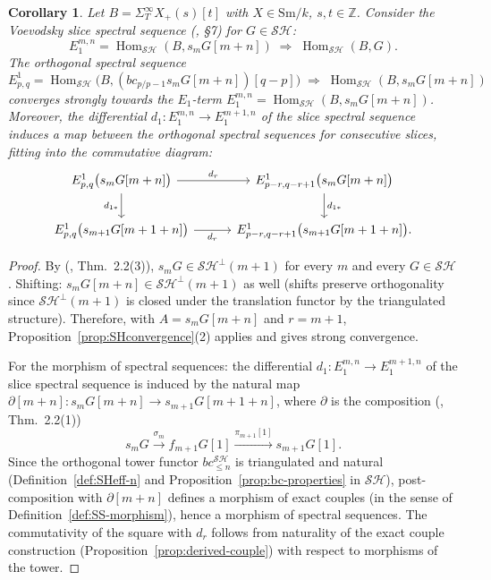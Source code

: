 \documentclass[12pt,a4paper]{article}
\newtheorem{corollary}[theorem]{Corollary}
\theoremstyle{definition}
\newcommand{\Sm}{\mathrm{Sm}}
\newcommand{\SH}{\mathcal{SH}}
\newcommand{\Hom}{\operatorname{Hom}}
\newcommand{\Z}{\mathbb{Z}}
\begin{document}
\begin{corollary}\label{cor:sliceconv}
Let $B=\Sigma_T^\infty X_+(s)[t]$ with $X\in\Sm/k$, $s,t\in\Z$.  Consider the
Voevodsky slice spectral sequence (\cite{Voe02a}, \S7) for $G\in\SH$:
\[
  E_1^{m,n} = \Hom_{\SH}(B,s_mG[m+n])\;\Rightarrow\;\Hom_{\SH}(B,G).
\]
The orthogonal spectral sequence
\[
  E^1_{p,q} = \Hom_{\SH}\!\bigl(B,(bc_{p/p-1}s_mG[m+n])[q-p]\bigr)
  \;\Rightarrow\;\Hom_{\SH}(B,s_mG[m+n])
\]
converges strongly towards the $E_1$-term
$E_1^{m,n}=\Hom_{\SH}(B,s_mG[m+n])$.  Moreover, the differential
$d_1:E_1^{m,n}\to E_1^{m+1,n}$ of the slice spectral sequence induces a map
between the orthogonal spectral sequences for consecutive slices, fitting into
the commutative diagram:
\[
\begin{tikzcd}[column sep=3em, row sep=2em]
  E^1_{p,q}\bigl(s_mG[m+n]\bigr) \ar[r,"d_r"] \ar[d,"d_{1*}"'] &
    E^1_{p-r,q-r+1}\bigl(s_mG[m+n]\bigr) \ar[d,"d_{1*}"] \\
  E^1_{p,q}\bigl(s_{m+1}G[m+1+n]\bigr) \ar[r,"d_r"'] &
    E^1_{p-r,q-r+1}\bigl(s_{m+1}G[m+1+n]\bigr).
\end{tikzcd}
\]
\end{corollary}
\begin{proof}
By (\cite{Voe02a}, Thm.\ 2.2(3)), $s_mG\in\SH^\perp(m+1)$ for every $m$ and every
$G\in\SH$.  Shifting: $s_mG[m+n]\in\SH^\perp(m+1)$ as well (shifts preserve
orthogonality since $\SH^\perp(m+1)$ is closed under the translation functor by
the triangulated structure).  Therefore, with $A=s_mG[m+n]$ and $r=m+1$,
Proposition~\ref{prop:SHconvergence}(2) applies and gives strong convergence.

For the morphism of spectral sequences: the differential
$d_1:E_1^{m,n}\to E_1^{m+1,n}$ of the slice spectral sequence is induced by the
natural map $\partial[m+n]:s_mG[m+n]\to s_{m+1}G[m+1+n]$, where $\partial$ is the
composition (\cite{Voe02a}, Thm.\ 2.2(1))
\[
  s_mG \xrightarrow{\sigma_m} f_{m+1}G[1] \xrightarrow{\pi_{m+1}[1]} s_{m+1}G[1].
\]
Since the orthogonal tower functor $bc_{\leq n}^{\SH}$ is triangulated and natural
(Definition~\ref{def:SHeff-n} and Proposition~\ref{prop:bc-properties} in $\SH$),
post-composition with $\partial[m+n]$ defines a morphism of exact couples
(in the sense of Definition~\ref{def:SS-morphism}), hence a morphism of spectral
sequences.  The commutativity of the square with $d_r$ follows from naturality of
the exact couple construction (Proposition~\ref{prop:derived-couple}) with respect
to morphisms of the tower.
\end{proof}
\end{document}
